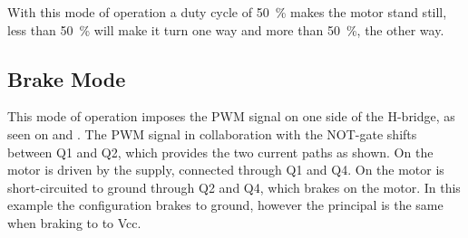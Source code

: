 \begin{minipage}{\linewidth}
\begin{minipage}{0.45\linewidth}
\begin{figure}[H]
  			\centering
  			\vspace{-.4cm}
  			\captionsetup{justification=centering}
  			\label{HbridgeCounterClokwise4Q}
  		\end{figure}
  	\end{minipage}
  \end{minipage}

With this mode of operation a duty cycle of \si{50 \%} makes the motor stand still, less than \si{50 \%} will make it turn one way and more than \si{50 \%}, the other way.

\subsection{Brake Mode}
This mode of operation imposes the PWM signal on one side of the H-bridge, as seen on  and . The PWM signal in collaboration with the NOT-gate shifts between Q1 and Q2, which provides the two current paths as shown. On  the motor is driven by the supply, connected through Q1 and Q4. On  the motor is short-circuited to ground through Q2 and Q4, which brakes on the motor. In this example the configuration brakes to ground, however the principal is the same when braking to to Vcc.\cite{PAndersen}

